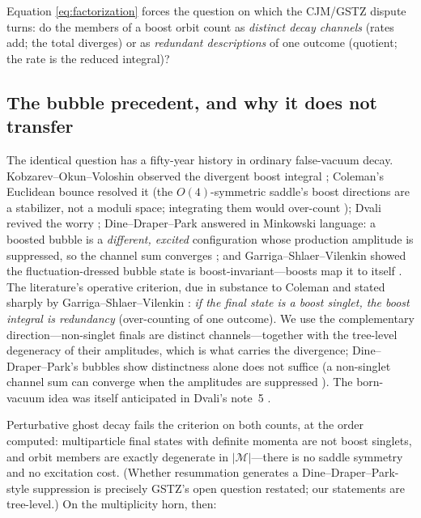 \documentclass[11pt]{article}
\theoremstyle{definition}
\theoremstyle{remark}
\begin{document}
Equation \eqref{eq:factorization} forces the question on which the
CJM/GSTZ dispute turns: do the members of a boost orbit count as
\emph{distinct decay channels} (rates add; the total diverges) or as
\emph{redundant descriptions} of one outcome (quotient; the rate is
the reduced integral)?

\subsection{The bubble precedent, and why it does not transfer}

The identical question has a fifty-year history in ordinary
false-vacuum decay. Kobzarev--Okun--Voloshin observed the divergent
boost integral \cite{KOV1975}; Coleman's Euclidean bounce resolved it
(the $O(4)$-symmetric saddle's boost directions are a stabilizer, not
a moduli space; integrating them would over-count
\cite{ColemanBounce}); Dvali revived the worry \cite{Dvali2011};
Dine--Draper--Park answered in Minkowski language: a boosted bubble is
a \emph{different, excited} configuration whose production amplitude
is suppressed, so the channel sum converges \cite{DDP2012}; and
Garriga--Shlaer--Vilenkin showed the fluctuation-dressed bubble state
is boost-invariant---boosts map it to itself \cite{GSV2011}. The
literature's operative criterion, due in substance to Coleman and
stated sharply by Garriga--Shlaer--Vilenkin \cite{GSV2011}: \emph{if
the final state is a boost singlet, the boost integral is
redundancy} (over-counting of one outcome). We use the complementary
direction---non-singlet finals are distinct channels---together with
the tree-level degeneracy of their amplitudes, which is what carries
the divergence; Dine--Draper--Park's bubbles show distinctness alone
does not suffice (a non-singlet channel sum can converge when the
amplitudes are suppressed \cite{DDP2012}). The born-vacuum idea was
itself anticipated in Dvali's note~5 \cite{Dvali2011}.

Perturbative ghost decay fails the criterion on both counts, at the
order computed: multiparticle final states with definite momenta are
not boost singlets, and orbit members are exactly degenerate in
$|\mathcal M|$---there is no saddle symmetry and no excitation cost.
(Whether resummation generates a Dine--Draper--Park-style suppression
is precisely GSTZ's open question restated; our statements are
tree-level.) On the multiplicity horn, then:
\end{document}
